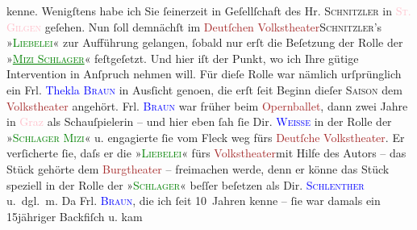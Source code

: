                kenne. Wenigſtens habe ich Sie ſeinerzeit in Geſellſchaft des Hr. \textsc{Schnitzler} in \textcolor{pink}{\textsc{St. Gilgen}}{}\ledrightnote{\textcolor{pink}{St. Gilgen}} geſehen.\pend
           \pstart
           Nun ſoll demnächſt im \textcolor{brown}{Deutſchen Volkstheater}{}\ledrightnote{\textcolor{brown}{Volkstheater}}{ }\textsc{Schnitzler}’s »\textcolor{green}{\textsc{Liebelei}}{}\ledrightnote{\textcolor{green}{Liebelei. Schauspiel in drei Akten}}« zur Aufführung ge{\pb}langen,
               ſobald nur erſt die Beſetzung der Rolle der »\textcolor{green}{\textsc{\uline{Mizi Schlager}}}{}« feſtgeſetzt. Und hier iſt der Punkt, wo ich Ihre gütige Intervention in
               Anſpruch nehmen will.\pend
           \pstart
           Für dieſe Rolle war nämlich urſprünglich ein Frl. \textcolor{blue}{Thekla \textsc{Braun}}{}\ledrightnote{\textcolor{blue}{Thekla Maria Braun}} in Ausſicht geno{\geminationm}en, die erſt ſeit Beginn dieſer
                  \textsc{Saison} dem \textcolor{brown}{Volkstheater}{}\ledrightnote{\textcolor{brown}{Volkstheater}}
               angehört. Frl. \textcolor{blue}{\textsc{Braun}}{}\ledrightnote{\textcolor{blue}{Thekla Maria Braun}} war früher beim \textcolor{brown}{Opernballet}{}\ledrightnote{\textcolor{brown}{Opernballett}}, dann zwei Jahre
               in \textcolor{pink}{Graz}{}\ledrightnote{\textcolor{pink}{Graz}} als Schauſpielerin – und hier eben ſah ſie
               Dir. \textcolor{blue}{\textsc{Weisse}}{}\ledrightnote{\textcolor{blue}{Adolf Weisse}} in der Rolle der »\textcolor{green}{\textsc{Schlager Mizi}}{}« u. engagierte ſie vom Fleck weg fürs \textcolor{brown}{Deutſche
                  Volkstheater}{}\ledrightnote{\textcolor{brown}{Volkstheater}}. Er verſicherte ſie, daſs er die »\textcolor{green}{\textsc{Liebelei}}{}\ledrightnote{\textcolor{green}{Liebelei. Schauspiel in drei Akten}}« fürs \textcolor{brown}{Volkstheater}{}\ledrightnote{\textcolor{brown}{Volkstheater}}{ }{\pb}mit Hilfe des Autors – das Stück
               gehörte dem \textcolor{brown}{Burgtheater}{}\ledrightnote{\textcolor{brown}{Burgtheater}} – freimachen werde, denn er
               könne das Stück speziell in der Rolle der »\textcolor{green}{\textsc{Schlager}}{}« beſſer beſetzen als Dir. \textcolor{blue}{\textsc{Schlenther}}{}\ledrightnote{\textcolor{blue}{Paul Schlenther}} u. dgl. m. Da Frl. \textcolor{blue}{\textsc{Braun}}{}\ledrightnote{\textcolor{blue}{Thekla Maria Braun}}, die ich ſeit 10 Jahren kenne – ſie war damals ein 15jähriger Backfiſch u. kam

